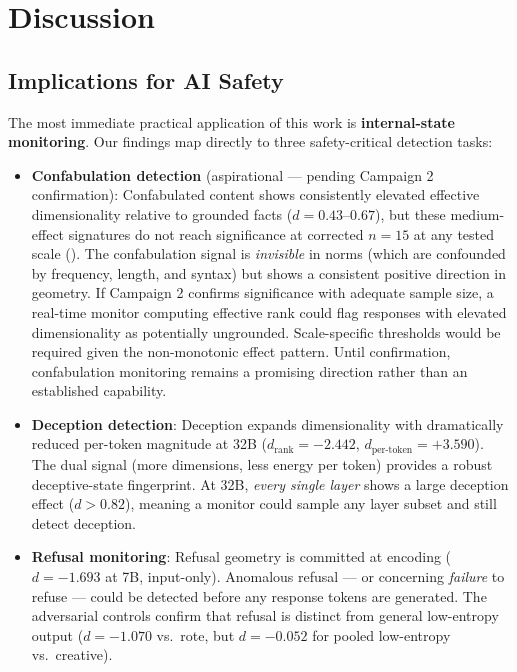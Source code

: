 \documentclass[11pt,a4paper]{article}
\begin{document}
\section{Discussion}
\label{sec:discussion}

\subsection{Implications for AI Safety}
\label{sec:safety}

The most immediate practical application of this work is \textbf{internal-state monitoring}. Our findings map directly to three safety-critical detection tasks:

\begin{itemize}[leftmargin=*]
    \item \textbf{Confabulation detection} (aspirational --- pending Campaign 2 confirmation): Confabulated content shows consistently elevated effective dimensionality relative to grounded facts ($d = 0.43$--$0.67$), but these medium-effect signatures do not reach significance at corrected $n = 15$ at any tested scale (). The confabulation signal is \emph{invisible} in norms (which are confounded by frequency, length, and syntax) but shows a consistent positive direction in geometry. If Campaign 2 confirms significance with adequate sample size, a real-time monitor computing effective rank could flag responses with elevated dimensionality as potentially ungrounded. Scale-specific thresholds would be required given the non-monotonic effect pattern. Until confirmation, confabulation monitoring remains a promising direction rather than an established capability.

    \item \textbf{Deception detection}: Deception expands dimensionality with dramatically reduced per-token magnitude at 32B ($d_{\text{rank}} = -2.442$, $d_{\text{per-token}} = +3.590$). The dual signal (more dimensions, less energy per token) provides a robust deceptive-state fingerprint. At 32B, \emph{every single layer} shows a large deception effect ($d > 0.82$), meaning a monitor could sample any layer subset and still detect deception.

    \item \textbf{Refusal monitoring}: Refusal geometry is committed at encoding ($d = -1.693$ at 7B, input-only). Anomalous refusal --- or concerning \emph{failure} to refuse --- could be detected before any response tokens are generated. The adversarial controls confirm that refusal is distinct from general low-entropy output ($d = -1.070$ vs.\ rote, but $d = -0.052$ for pooled low-entropy vs.\ creative).
\end{itemize}
\end{document}
